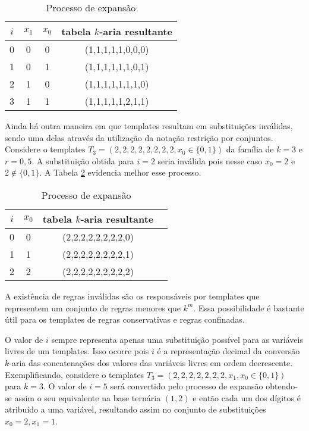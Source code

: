 	\begin{table}[h!]
	\centering
	\caption{Processo de expansão}
	{
		\vspace{0.3cm}
		\begin{tabular}{cccc}
		\hline
		$i$ & $x_1$ & $x_0$ & tabela $k$-aria resultante \\
		\hline
		0	&	0	&	0	&	(1,1,1,1,1,0,0,0)	\\
		1	&	0	&	1	&	(1,1,1,1,1,1,0,1)	\\
		2	&	1	&	0	&	(1,1,1,1,1,1,1,0)	\\
		3	&	1	&	1	&	(1,1,1,1,1,2,1,1)	\\
		\hline
		\end{tabular}
	}
	\label{tab:invalideExpansion}
	\end{table}

	Ainda há outra maneira em que templates resultam em substituições inválidas, sendo uma delas através da utilização da notação restrição por conjuntos. Considere o templates $T_3 = (2,2,2,2,2,2,2,2,x_0\in \{0,1\})$ da família de $k=3$ e $r=0,5$. A substituição obtida para $i = 2$ seria inválida pois nesse caso $x_0 = 2$ e $2 \notin \{0,1\}$. A Tabela \ref{tab:invalideExpansion2} evidencia melhor esse processo.

	\begin{table}[h!]
	\centering
	\caption{Processo de expansão}
	{
		\vspace{0.3cm}
		\begin{tabular}{cccc}
		\hline
		$i$ & $x_0$ & tabela $k$-aria resultante \\
		\hline
		0	&	0	&	(2,2,2,2,2,2,2,2,0)	\\
		1	&	1	&	(2,2,2,2,2,2,2,2,1)	\\
		2	&	2	&	(2,2,2,2,2,2,2,2,2)	\\
		\hline
		\end{tabular}
	}
	\label{tab:invalideExpansion2}
	\end{table}

	A existência de regras inválidas são os responsáveis por templates que representem um conjunto de regras menores que $k^m$. Essa possibilidade é bastante útil para os templates de regras conservativas e regras confinadas.

	O valor de $i$ sempre representa apenas uma substituição possível para as variáveis livres de um templates. Isso ocorre pois $i$ é a representação decimal da conversão $k$-aria das concatenações dos valores das variáveis livres em ordem decrescente. Exemplificando, considere o templates $T_3 = (2,2,2,2,2,2,2,x_1,x_0\in \{0,1\})$ para $k=3$. O valor de $i=5$ será convertido pelo processo de expansão obtendo-se assim o seu equivalente na base ternária $(1,2)$ e então cada um dos dígitos é atribuído a uma variável, resultando assim no conjunto de substituições ${x_0=2,x_1=1}$.

